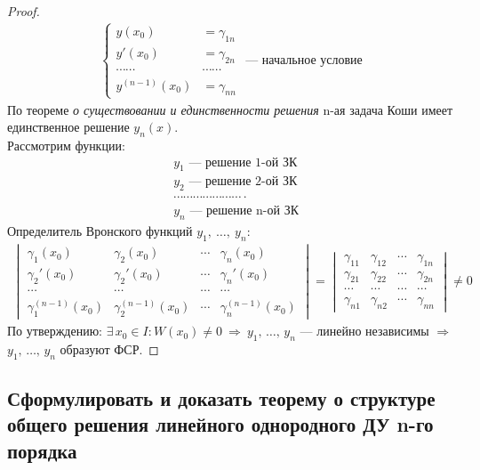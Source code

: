 \begin{proof}
\begin{gather*}
        \left\{ \begin{aligned}
            y(x_0) &= \gamma_{1n} \\
            y'(x_0) &= \gamma_{2n}\\
            \cdots\cdots&\cdots\cdots \\
            y^{(n-1)}(x_0) &= \gamma_{nn} 
        \end{aligned}\right.\text{ --- начальное условие}
    \end{gather*}
    По теореме \textit{о существовании и единственности решения} n-ая задача Коши имеет единственное решение $y_n(x)$. \\
    Рассмотрим функции:
    \begin{align*}
        &y_1 \text{ --- решение 1-ой ЗК} \\
        &y_2 \text{ --- решение 2-ой ЗК} \\
        &\cdots\cdots\cdots\cdots\cdots\cdots\cdots\cdot \\
        &y_n \text{ --- решение n-ой ЗК} 
    \end{align*}
    Определитель Вронского функций $y_1,\ \ldots,\ y_n\colon$
    \begin{gather*}
        \begin{vmatrix}
            \gamma_{1}(x_0) & \gamma_{2}(x_0) & \cdots & \gamma_{n}(x_0) \\
            \gamma_{2}'(x_0) & \gamma_{2}'(x_0) & \cdots & \gamma_{n}'(x_0) \\
            \cdots & \cdots & \cdots & \cdots \\
            \gamma_{1}^{(n-1)}(x_0) & \gamma_{2}^{(n-1)}(x_0) & \cdots & \gamma_{n}^{(n-1)}(x_0)
        \end{vmatrix} = \begin{vmatrix}
            \gamma_{11} & \gamma_{12} & \cdots & \gamma_{1n} \\
            \gamma_{21} & \gamma_{22} & \cdots & \gamma_{2n} \\
            \cdots & \cdots & \cdots & \cdots \\
            \gamma_{n1} & \gamma_{n2} & \cdots & \gamma_{nn}
        \end{vmatrix} \ne 0
    \end{gather*}
    По утверждению: $\exists\, x_0 \in I\colon W(x_0) \ne 0\ \Rightarrow\ y_1,\,\ldots,\, y_n$ --- линейно независимы $\Rightarrow$ $y_1,\,\ldots,\, y_n$ образуют ФСР.
\end{proof}

\newpage
\subsection{Сформулировать и доказать теорему о структуре общего решения линейного однородного ДУ n-го порядка}

